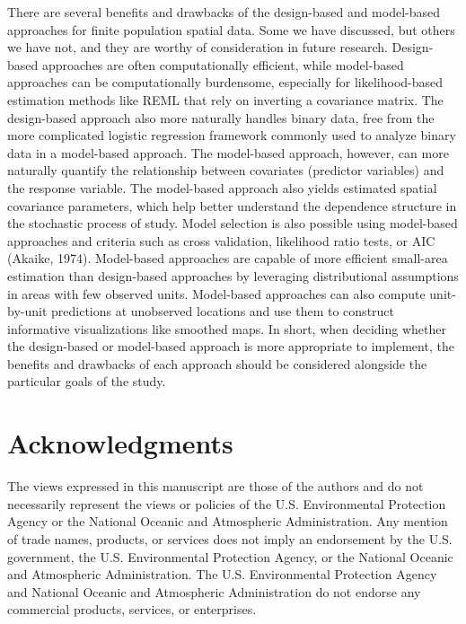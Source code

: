 \documentclass[]{elsarticle} %
\begin{document}
There are several benefits and drawbacks of the design-based and
model-based approaches for finite population spatial data. Some we have
discussed, but others we have not, and they are worthy of consideration
in future research. Design-based approaches are often computationally
efficient, while model-based approaches can be computationally
burdensome, especially for likelihood-based estimation methods like REML
that rely on inverting a covariance matrix. The design-based approach
also more naturally handles binary data, free from the more complicated
logistic regression framework commonly used to analyze binary data in a
model-based approach. The model-based approach, however, can more
naturally quantify the relationship between covariates (predictor
variables) and the response variable. The model-based approach also
yields estimated spatial covariance parameters, which help better
understand the dependence structure in the stochastic process of study.
Model selection is also possible using model-based approaches and
criteria such as cross validation, likelihood ratio tests, or AIC
(Akaike, 1974). Model-based approaches are capable of more efficient
small-area estimation than design-based approaches by leveraging
distributional assumptions in areas with few observed units. Model-based
approaches can also compute unit-by-unit predictions at unobserved
locations and use them to construct informative visualizations like
smoothed maps. In short, when deciding whether the design-based or
model-based approach is more appropriate to implement, the benefits and
drawbacks of each approach should be considered alongside the particular
goals of the study.

\hypertarget{acknowledgments}{%
\section*{Acknowledgments}\label{acknowledgments}}

The views expressed in this manuscript are those of the authors and do
not necessarily represent the views or policies of the U.S.
Environmental Protection Agency or the National Oceanic and Atmospheric
Administration. Any mention of trade names, products, or services does
not imply an endorsement by the U.S. government, the U.S. Environmental
Protection Agency, or the National Oceanic and Atmospheric
Administration. The U.S. Environmental Protection Agency and National
Oceanic and Atmospheric Administration do not endorse any commercial
products, services, or enterprises.
\end{document}
